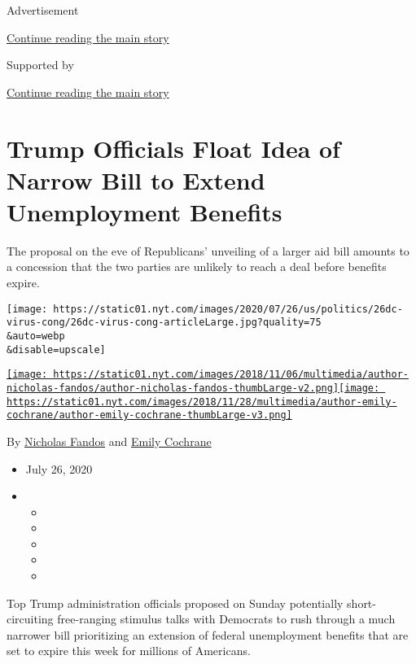 Advertisement

\protect\hyperlink{after-top}{Continue reading the main story}

Supported by

\protect\hyperlink{after-sponsor}{Continue reading the main story}

\hypertarget{trump-officials-float-idea-of-narrow-bill-to-extend-unemployment-benefits}{%
\section{Trump Officials Float Idea of Narrow Bill to Extend
Unemployment
Benefits}\label{trump-officials-float-idea-of-narrow-bill-to-extend-unemployment-benefits}}

The proposal on the eve of Republicans' unveiling of a larger aid bill
amounts to a concession that the two parties are unlikely to reach a
deal before benefits expire.

\texttt{[image: https://static01.nyt.com/images/2020/07/26/us/politics/26dc-virus-cong/26dc-virus-cong-articleLarge.jpg?quality=75\\\&auto=webp\\\&disable=upscale]}

\href{https://www.nytimes.com/by/nicholas-fandos}{\texttt{[image: https://static01.nyt.com/images/2018/11/06/multimedia/author-nicholas-fandos/author-nicholas-fandos-thumbLarge-v2.png]}}\href{https://www.nytimes.com/by/emily-cochrane}{\texttt{[image: https://static01.nyt.com/images/2018/11/28/multimedia/author-emily-cochrane/author-emily-cochrane-thumbLarge-v3.png]}}

By \href{https://www.nytimes.com/by/nicholas-fandos}{Nicholas Fandos}
and \href{https://www.nytimes.com/by/emily-cochrane}{Emily Cochrane}

\begin{itemize}
\item
  July 26, 2020
\item
  \begin{itemize}
  \item
  \item
  \item
  \item
  \item
  \end{itemize}
\end{itemize}

Top Trump administration officials proposed on Sunday potentially
short-circuiting free-ranging stimulus talks with Democrats to rush
through a much narrower bill prioritizing an extension of federal
unemployment benefits that are set to expire this week for millions of
Americans.

